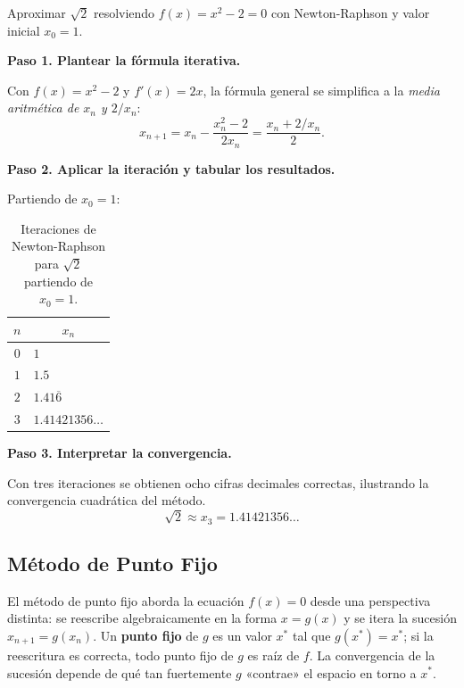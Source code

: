 \begin{example}
Aproximar $\sqrt{2}$ resolviendo $f(x)=x^2-2=0$ con Newton-Raphson
y valor inicial $x_0=1$.
\begin{myproof}
\textbf{Paso 1. Plantear la fórmula iterativa.}

Con $f(x)=x^2-2$ y $f'(x)=2x$, la fórmula general se simplifica a la
\emph{media aritmética de $x_n$ y $2/x_n$}:
\[
x_{n+1} = x_n - \frac{x_n^2-2}{2x_n} = \frac{x_n + 2/x_n}{2}.
\]

\textbf{Paso 2. Aplicar la iteración y tabular los resultados.}

Partiendo de $x_0=1$:

\begin{table}[H]
\centering
\begin{tabular}{c l}
\toprule
$n$ & \multicolumn{1}{c}{$x_n$} \\
\midrule
$0$ & $1$ \\
$1$ & $1.5$ \\
$2$ & $1.41\overline{6}$ \\
$3$ & $1.41421356\ldots$ \\
\bottomrule
\end{tabular}
\caption{Iteraciones de Newton-Raphson para $\sqrt{2}$ partiendo de $x_0=1$.}
\end{table}

\textbf{Paso 3. Interpretar la convergencia.}

Con tres iteraciones se obtienen ocho cifras decimales correctas,
ilustrando la convergencia cuadrática del método.
\[
\boxed{\sqrt{2} \approx x_3 = 1.41421356\ldots}
\]
\end{myproof}
\end{example}

\subsection{Método de Punto Fijo}

El método de punto fijo aborda la ecuación $f(x)=0$ desde una
perspectiva distinta: se reescribe algebraicamente en la forma
$x=g(x)$ y se itera la sucesión $x_{n+1}=g(x_n)$. Un
\textbf{punto fijo} de $g$ es un valor $x^*$ tal que $g(x^*)=x^*$; si
la reescritura es correcta, todo punto fijo de $g$ es raíz de $f$.
La convergencia de la sucesión depende de qué tan fuertemente $g$
«contrae» el espacio en torno a $x^*$.

